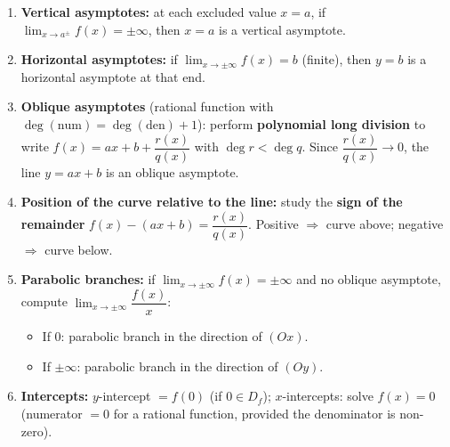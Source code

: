 \documentclass[11pt]{article}
\begin{document}
\begin{methode}
\begin{enumerate}
\item \textbf{Vertical asymptotes:} at each excluded value $x = a$, if $\lim_{x\to a^{\pm}} f(x) = \pm\infty$, then $x = a$ is a vertical asymptote.
\item \textbf{Horizontal asymptotes:} if $\lim_{x\to\pm\infty} f(x) = b$ (finite), then $y = b$ is a horizontal asymptote at that end.
\item \textbf{Oblique asymptotes} (rational function with $\deg(\text{num}) = \deg(\text{den}) + 1$): perform \textbf{polynomial long division} to write $f(x) = ax + b + \dfrac{r(x)}{q(x)}$ with $\deg r < \deg q$. Since $\dfrac{r(x)}{q(x)} \to 0$, the line $y = ax + b$ is an oblique asymptote.
\item \textbf{Position of the curve relative to the line:} study the \textbf{sign of the remainder} $f(x) - (ax+b) = \dfrac{r(x)}{q(x)}$. Positive $\Rightarrow$ curve above; negative $\Rightarrow$ curve below.
\item \textbf{Parabolic branches:} if $\lim_{x\to\pm\infty} f(x) = \pm\infty$ and no oblique asymptote, compute $\lim_{x\to\pm\infty} \dfrac{f(x)}{x}$:
\begin{itemize}
\item If $0$: parabolic branch in the direction of $(Ox)$.
\item If $\pm\infty$: parabolic branch in the direction of $(Oy)$.
\end{itemize}
\item \textbf{Intercepts:} $y$-intercept $= f(0)$ (if $0 \in D_f$); $x$-intercepts: solve $f(x) = 0$ (numerator $=0$ for a rational function, provided the denominator is non-zero).
\end{enumerate}
\end{methode}
\end{document}

